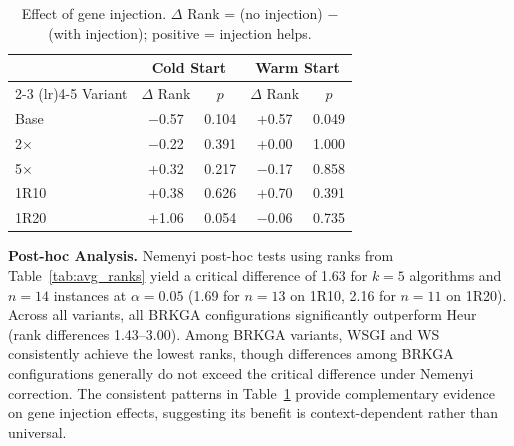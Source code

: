 \documentclass[sigconf]{acmart}
\begin{document}

\begin{table}[t]
\centering
\caption{Effect of gene injection. $\Delta$ Rank = (no injection) $-$ (with injection); positive = injection helps.}
\label{tab:gene_injection}
\small
\begin{tabular}{lcccc}
\toprule
 & \multicolumn{2}{c}{Cold Start} & \multicolumn{2}{c}{Warm Start} \\
\cmidrule(lr){2-3} \cmidrule(lr){4-5}
Variant & $\Delta$ Rank & $p$ & $\Delta$ Rank & $p$ \\
\midrule
Base     & $-$0.57 & 0.104 & +0.57 & 0.049 \\
2$\times$ & $-$0.22 & 0.391 & +0.00 & 1.000 \\
5$\times$ & +0.32 & 0.217 & $-$0.17 & 0.858 \\
1R10     & +0.38 & 0.626 & +0.70 & 0.391 \\
1R20     & +1.06 & 0.054 & $-$0.06 & 0.735 \\
\bottomrule
\end{tabular}
\end{table}

\textbf{Post-hoc Analysis.} Nemenyi post-hoc tests using ranks from Table~\ref{tab:avg_ranks} yield a critical difference of 1.63 for $k=5$ algorithms and $n=14$ instances at $\alpha=0.05$ (1.69 for $n=13$ on 1R10, 2.16 for $n=11$ on 1R20). Across all variants, all BRKGA configurations significantly outperform Heur (rank differences 1.43--3.00). Among BRKGA variants, WSGI and WS consistently achieve the lowest ranks, though differences among BRKGA configurations generally do not exceed the critical difference under Nemenyi correction. The consistent patterns in Table~\ref{tab:gene_injection} provide complementary evidence on gene injection effects, suggesting its benefit is context-dependent rather than universal.
\end{document}
